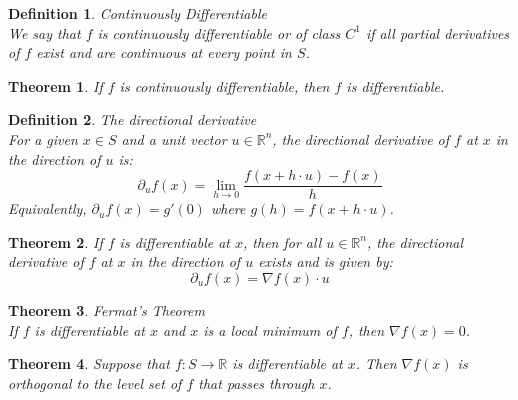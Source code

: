 \documentclass[11pt]{book} %
\newtheorem{theorem}{Theorem}[section]
\newtheorem{definition}{Definition}[section]
\begin{document}
\bigbreak

\begin{definition}{Continuously Differentiable} \\
We say that $f$ is continuously differentiable or of class $C^1$  if all partial derivatives of $f$ exist and are continuous at every point in $S$.
\end{definition}

\bigbreak

\begin{theorem}
If $f$ is continuously differentiable, then $f$ is differentiable.
\end{theorem}

\bigbreak

\begin{definition}{The directional derivative} \\
For a given $x \in S$ and a unit vector $u \in \mathbb{R}^n$, the directional derivative of $f$ at $x$ in the direction of $u$ is:
\begin{equation}
    \partial_u f(x) = \lim_{h \rightarrow 0} \frac{f(x + h \cdot u) - f(x)}{h}
\end{equation}
Equivalently, $\partial_u f(x) = g'(0)$ where $g(h) = f(x + h \cdot u)$.
\end{definition}

\bigbreak

\begin{theorem}
If $f$ is differentiable at $x$, then for all $u \in \mathbb{R}^n$, the directional derivative of $f$ at $x$ in the direction of $u$ exists and is given by:
\begin{equation}
    \partial_u f(x) = \nabla f(x) \cdot u
\end{equation}
\end{theorem}

\bigbreak

\begin{theorem}{Fermat's Theorem} \\
If $f$ is differentiable at $x$ and $x$ is a local minimum of $f$, then $\nabla f(x) = 0$.
\end{theorem}

\bigbreak

\begin{theorem}
Suppose that $f: S \rightarrow \mathbb{R}$ is differentiable at $x$. Then $\nabla f(x)$ is orthogonal to the level set of $f$ that passes through $x$.    
\end{theorem}

\bigbreak
\end{document}
